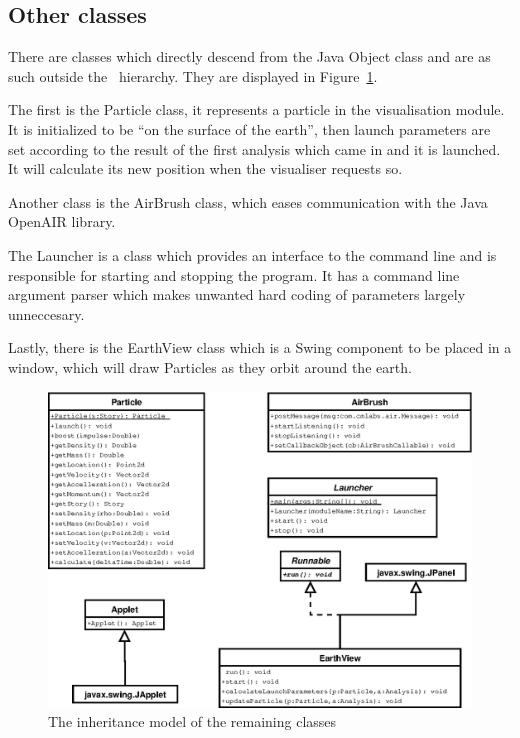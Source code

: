 \subsection{Other classes}

There are classes which directly descend from the Java Object class and are as
such outside the \Amber\ hierarchy. They are displayed in
Figure~\ref{fig:class-diagram}.

The first is the Particle class, it represents a particle in the visualisation
module. It is initialized to be ``on the surface of the earth'', then launch
parameters are set according to the result of the first analysis which came in
and it is launched. It will calculate its new position when the visualiser
requests so.

Another class is the AirBrush class, which eases communication with the Java
OpenAIR library.

The Launcher is a class which provides an interface to the command line and is
responsible for starting and stopping the program. It has a command line
argument parser which makes unwanted hard coding of parameters largely
unneccesary.

Lastly, there is the EarthView class which is a Swing component to be placed in
a window, which will draw Particles as they orbit around the earth.

\begin{figure}[htp]
  \centering
  \includegraphics{design/image/class-diagram}
  \caption{
    \label{fig:class-diagram}
    The inheritance model of the remaining classes}
\end{figure}

